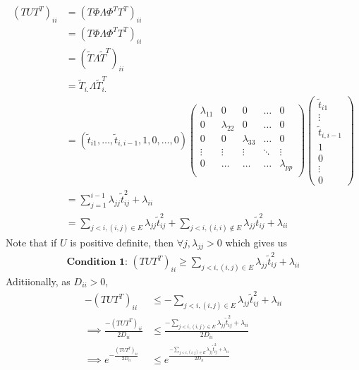 \documentclass[12pt, leqno]{article}
\begin{document}
\begin{align*}
(TUT^T)_{ii} &= (T \Phi \Lambda \Phi^T T^T)_{ii} \\
&=  (T \Phi \Lambda \Phi^T T^T) _{ii} \\
&=  (\tilde{T} \Lambda \tilde{T}^T)_{ii} \\
&=  \tilde{T}_{i.} \Lambda \tilde{T}_{i.}^T \\
&=  (\tilde{t}_{i1}, \dots ,\tilde{t}_{i,i-1},1,0,\dots,0 )
\begin{pmatrix} 
\lambda_{11} & 0 & 0 & \dots & 0\\
0& \lambda_{22}  & 0 & \dots & 0\\
0& 0& \lambda_{33}  & \dots & 0\\
\vdots & \vdots & \vdots & \ddots & \vdots\\
 0 & \dots & \dots & \dots & \lambda_{pp} \\
\end{pmatrix} 
\begin{pmatrix} \tilde{t}_{i1} \\ \vdots \\ \tilde{t}_{i,i-1} \\ 1 \\
  0 \\ \vdots \\0 
\end{pmatrix} \\
&= \sum_{j=1}^{i-1} \lambda_{jj} \tilde{t}_{ij}^2 + \lambda_{ii} \\
&= \sum_{j<i,(i,j) \in E}\lambda_{jj} \tilde{t}_{ij}^2 +
  \sum_{j<i,(i,i) \not \in E}\lambda_{jj} \tilde{t}_{ij}^2 + \lambda_{ii} 
\end{align*}
Note that if $U$ is positive definite, then $\forall j, \lambda_{jj}>0
$ which gives us 
\begin{align*}
\textbf{Condition 1: } (TUT^T)_{ii} \geq \sum_{j<i,(i,j) \in E}\lambda_{jj} \tilde{t}_{ij}^2 + \lambda_{ii} 
\end{align*}
Aditiionally, as $D_{ii}>0$,
\begin{align*}
-(TUT^T)_{ii} &\leq -\sum_{j<i,(i,j) \in E}\lambda_{jj}
                \tilde{t}_{ij}^2 + \lambda_{ii} \\
\implies \frac{-(TUT^T)_{ii} }{2D_{ii}} &\leq \frac{-\sum_{j<i,(i,j) \in E}\lambda_{jj}
                \tilde{t}_{ij}^2 + \lambda_{ii}}{2D_{ii}} \\
\implies e^{-\frac{(TUT^T)_{ii} }{2D_{ii}}}&\leq e^{\frac{-\sum_{j<i,(i,j) \in E}\lambda_{jj}
                \tilde{t}_{ij}^2 + \lambda_{ii}}{2D_{ii}}}
\end{align*}
\end{document}

